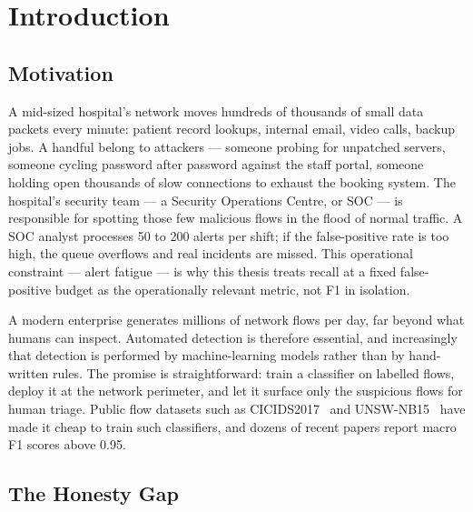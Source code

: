 \chapter{Introduction}
\label{ch:intro}

\section{Motivation}

A mid-sized hospital's network moves hundreds of thousands of small data
packets every minute: patient record lookups, internal email, video
calls, backup jobs. A handful belong to attackers --- someone probing
for unpatched servers, someone cycling password after password against
the staff portal, someone holding open thousands of slow connections to
exhaust the booking system. The hospital's security team --- a Security
Operations Centre, or SOC --- is responsible for spotting those few
malicious flows in the flood of normal traffic. A SOC analyst processes
50 to 200 alerts per shift; if the false-positive rate is too high, the
queue overflows and real incidents are missed. This operational
constraint --- alert fatigue --- is why this thesis treats recall at a
fixed false-positive budget as the operationally relevant metric, not F1
in isolation.

A modern enterprise generates millions of network flows per day, far
beyond what humans can inspect. Automated detection is therefore
essential, and increasingly that detection is performed by
machine-learning models rather than by hand-written rules. The promise
is straightforward: train a classifier on labelled flows, deploy it at
the network perimeter, and let it surface only the suspicious flows for
human triage. Public flow datasets such as
CICIDS2017~\cite{Sharafaldin2018} and UNSW-NB15~\cite{Moustafa2015}
have made it cheap to train such classifiers, and dozens of recent
papers report macro F1 scores above 0.95.


\section{The Honesty Gap}

